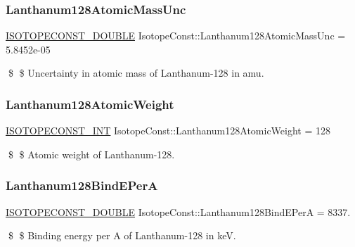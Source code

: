 \subsubsection{\texorpdfstring{Lanthanum128\+Atomic\+Mass\+Unc}{Lanthanum128AtomicMassUnc}}
{\footnotesize\ttfamily \mbox{\hyperlink{group___isotope_const-_macros_ga8f45a7272ce02c0b4c65c44636ed719a}{I\+S\+O\+T\+O\+P\+E\+C\+O\+N\+S\+T\+\_\+\+D\+O\+U\+B\+LE}} Isotope\+Const\+::\+Lanthanum128\+Atomic\+Mass\+Unc = 5.\+8452e-\/05}

\$ \$ Uncertainty in atomic mass of Lanthanum-\/128 in amu. \mbox{\label{group___isotope_const-_lanthanum-_la128_ga8385d7b533abaa6836e7074ca15e3aca}} 
\subsubsection{\texorpdfstring{Lanthanum128\+Atomic\+Weight}{Lanthanum128AtomicWeight}}
{\footnotesize\ttfamily \mbox{\hyperlink{group___isotope_const-_macros_ga5f18360b3e99483a35c32d789e62621c}{I\+S\+O\+T\+O\+P\+E\+C\+O\+N\+S\+T\+\_\+\+I\+NT}} Isotope\+Const\+::\+Lanthanum128\+Atomic\+Weight = 128}

\$ \$ Atomic weight of Lanthanum-\/128. \mbox{\label{group___isotope_const-_lanthanum-_la128_gacebe077fac902a1bc4ab19fbc09bda81}} 
\subsubsection{\texorpdfstring{Lanthanum128\+Bind\+E\+PerA}{Lanthanum128BindEPerA}}
{\footnotesize\ttfamily \mbox{\hyperlink{group___isotope_const-_macros_ga8f45a7272ce02c0b4c65c44636ed719a}{I\+S\+O\+T\+O\+P\+E\+C\+O\+N\+S\+T\+\_\+\+D\+O\+U\+B\+LE}} Isotope\+Const\+::\+Lanthanum128\+Bind\+E\+PerA = 8337.}

\$ \$ Binding energy per A of Lanthanum-\/128 in keV. \mbox{\label{group___isotope_const-_lanthanum-_la128_ga205348ba83c86c26d57280bc047d1e3b}} 
